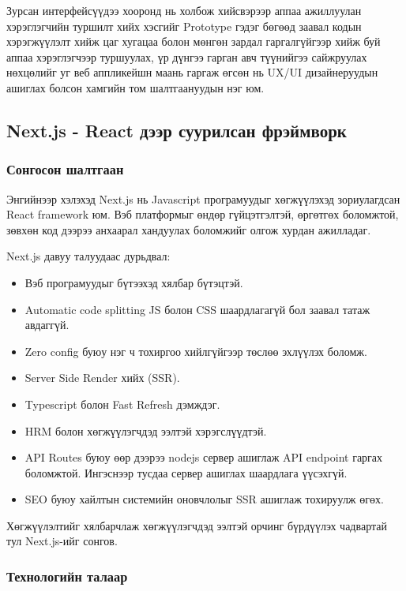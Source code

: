 Зурсан интерфейсүүдээ хооронд нь холбож хийсвэрээр аппаа ажиллуулан хэрэглэгчийн туршилт хийх хэсгийг Prototype гэдэг бөгөөд заавал кодын хэрэгжүүлэлт хийж цаг хугацаа болон мөнгөн зардал гаргалгүйгээр хийж буй аппаа хэрэглэгчээр туршуулах, үр дүнгээ гарган авч түүнийгээ сайжруулах нөхцөлийг уг веб аппликейшн маань гаргаж өгсөн нь UX/UI дизайнеруудын ашиглах болсон хамгийн том шалтгаануудын нэг юм.

\subsection{Next.js - React дээр суурилсан фрэймворк}

\subsubsection{Сонгосон шалтгаан}

Энгийнээр хэлэхэд Next.js нь Javascript програмуудыг хөгжүүлэхэд зориулагдсан React framework юм. Вэб платформыг өндөр гүйцэтгэлтэй, өргөтгөх боломжтой, зөвхөн код дээрээ анхаарал хандуулах боломжийг олгож хурдан ажилладаг.

Next.js давуу талуудаас дурьдвал:
\begin{itemize}
	\item Вэб програмуудыг бүтээхэд хялбар бүтэцтэй.
	\item Automatic code splitting JS болон CSS шаардлагагүй бол заавал татаж авдаггүй.
	\item Zero config буюу нэг ч тохиргоо хийлгүйгээр төслөө эхлүүлэх боломж.
	\item Server Side Render хийх (SSR).
	\item Typescript болон Fast Refresh дэмждэг.
	\item HRM болон хөгжүүлэгчдэд ээлтэй хэрэгслүүдтэй.
	\item API Routes буюу өөр дээрээ nodejs сервер ашиглаж API endpoint гаргах боломжтой. Ингэснээр тусдаа сервер ашиглах шаардлага үүсэхгүй.
	\item SEO буюу хайлтын системийн оновчлолыг SSR ашиглаж тохируулж өгөх.
\end{itemize}

Хөгжүүлэлтийг хялбарчлаж хөгжүүлэгчдэд ээлтэй орчинг бүрдүүлэх чадвартай тул Next.js-ийг сонгов.

\subsubsection{Технологийн талаар}

